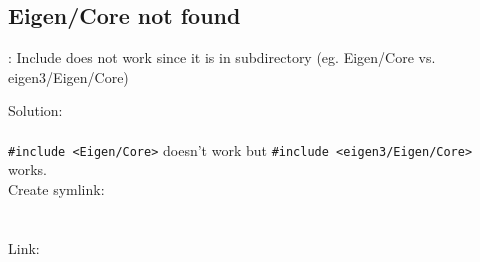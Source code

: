 

\subsection{ Eigen/Core not found }
\begin{bug}{}{}
	\caption{: Include does not work since it is in subdirectory (eg. Eigen/Core vs. eigen3/Eigen/Core)}
  Solution:\\
  \\
  \verb|#include <Eigen/Core>| doesn't work but \verb|#include <eigen3/Eigen/Core>| works.\\
  Create symlink: \\
  \\
  \\

  Link: \href{}{}\\
\end{bug}
